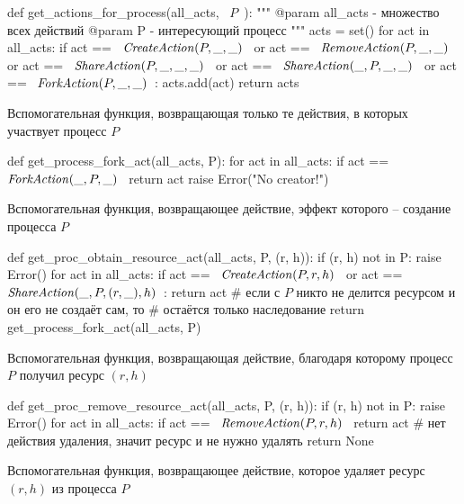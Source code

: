 \begin{listing}[ht!]
\begin{pythoncode}
def get_actions_for_process(all_acts, ~$P$~):
    """
    @param all_acts - множество всех действий
    @param P - интересующий процесс
    """
    acts = set()
    for act in all_acts:
        if act == ~$\crcreate{P}{\_}{\_}$~ or
               act == ~$\crremove{P}{\_}{\_}$~ or
               act == ~$\crshare{P}{\_}{\_}{\_}$~ or
               act == ~$\crshare{\_}{P}{\_}{\_}$~ or
               act == ~$\crfork{P}{\_}{\_}$~:
            acts.add(act)
    return acts
\end{pythoncode}
\caption{Вспомогательная функция, возвращающая только те действия, в которых участвует процесс $P$}
\label{code:relhelpFirst}
\end{listing}

\begin{listing}[ht!]
\begin{pythoncode}
def get_process_fork_act(all_acts, P):
    for act in all_acts:
        if act == ~$\crfork{\_}{P}{\_}$~
            return act
    raise Error("No creator!")
\end{pythoncode}
\caption{Вспомогательная функция, возвращающее действие, эффект которого -- создание процесса $P$}
\end{listing}

\begin{listing}[ht!]
\begin{pythoncode}
def get_proc_obtain_resource_act(all_acts, P, (r, h)):
    if (r, h) not in P:
        raise Error()
    for act in all_acts:
        if act == ~$\crcreate{P}{r}{h}$~ or
               act == ~$\crshare{\_}{P}{(r, \_)}{h}$~:
            return act
    # если с $P$ никто не делится ресурсом и он его не создаёт сам, то
    # остаётся только наследование
    return get_process_fork_act(all_acts, P)
\end{pythoncode}
\caption{Вспомогательная функция, возвращающая действие, благодаря которому процесс $P$ получил ресурс $(r, h)$}
\end{listing}

\begin{listing}[ht!]
\begin{pythoncode}
def get_proc_remove_resource_act(all_acts, P, (r, h)):
    if (r, h) not in P:
        raise Error()
    for act in all_acts:
        if act == ~$\crremove{P}{r}{h}$~
            return act
    # нет действия удаления, значит ресурс и не нужно удалять
    return None 
\end{pythoncode}
\caption{Вспомогательная функция, возвращающее действие, которое удаляет ресурс $(r, h)$ из процесса $P$}
\end{listing}

